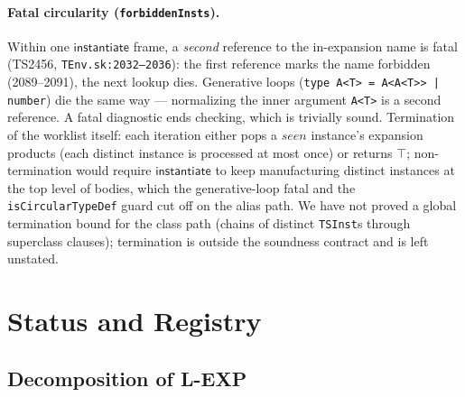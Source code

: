 \documentclass[11pt]{article}
\newcommand{\instop}{\mathsf{instantiate}}
\begin{document}
\paragraph{Fatal circularity (\texttt{forbiddenInsts}).}
Within one $\instop$ frame, a \emph{second} reference to the
in-expansion name is fatal (TS2456, \texttt{TEnv.sk:2032--2036}): the
first reference marks the name forbidden (2089--2091), the next lookup
dies. Generative loops (\texttt{type A<T> = A<A<T>> | number}) die the
same way — normalizing the inner argument \texttt{A<T>} is a second
reference. A fatal diagnostic ends checking, which is trivially sound.
Termination of the worklist itself: each iteration either pops a
$\mathit{seen}$ instance's expansion products (each distinct instance is
processed at most once) or returns $\top$; non-termination would require
$\instop$ to keep manufacturing distinct instances at the top level of
bodies, which the generative-loop fatal and the
\texttt{isCircularTypeDef} guard cut off on the alias path. We
have not proved a global termination bound for the class path (chains of
distinct \texttt{TSInst}s through superclass clauses); termination is
outside the soundness contract and is left unstated.

\section{Status and Registry}
\label{sec:status}

\subsection{Decomposition of L-EXP}
\end{document}

